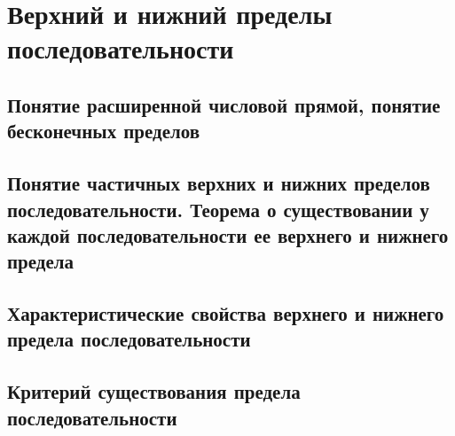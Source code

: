 \section{Верхний и нижний пределы последовательности}
\subsection{Понятие расширенной числовой прямой, понятие бесконечных пределов}
\subsection{Понятие частичных верхних и нижних пределов последовательности. Теорема о существовании у каждой последовательности ее верхнего и нижнего предела}
\subsection{Характеристические свойства верхнего и нижнего предела последовательности}

\subsection{Критерий существования предела последовательности}


